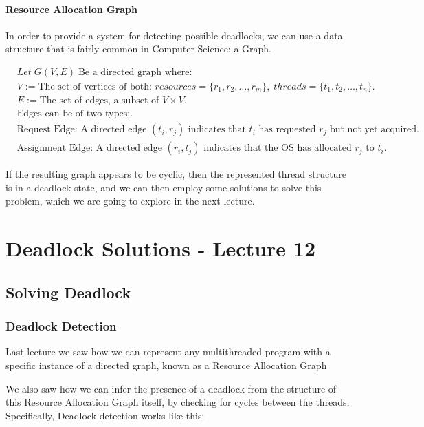 \documentclass[openright, twoside]{report}
\theoremstyle{definition}
\theoremstyle{example}
\newcommand{\sequence}[2]{
		\{ #1_1, #1_2, \dots, #1_#2 \}
}
\begin{document}
			\subsubsection{ Resource Allocation Graph}
			In order to provide a system for detecting possible deadlocks, 
			we can use a data structure that is fairly common in Computer Science: a Graph.

			\begin{align*}
				&Let \; G(V, E) \; \text{Be a directed graph where:}\\
				&V := \text{The set of vertices of both: } resources = \sequence{r}{m}, \; threads = \sequence{t}{n}.\\
				&E := \text{The set of edges, a subset of } V \times V.\\
				&\text{Edges can be of two types:}.\\
				&\text{Request Edge: A directed edge } (t_i, r_j) \text{ indicates that } t_i \text{ has requested } r_j \text{ but not yet acquired}.\\
				&\text{Assignment Edge: A directed edge } (r_i, t_j) \text{ indicates that the OS has allocated } r_j \text{ to } t_i.
			\end{align*}

			If the resulting graph appears to be cyclic, then the represented thread structure is in a deadlock state, and we can then employ some solutions to 
			solve this problem, which we are going to explore in the next lecture.

\chapter{Deadlock Solutions - Lecture 12}
\section{Solving Deadlock}
\subsection{Deadlock Detection}
Last lecture we saw how we can represent any multithreaded program with a 
specific instance of a directed graph, known as a Resource Allocation Graph

We also saw how we can infer the presence of a deadlock from the structure of this 
Resource Allocation Graph itself, by checking for cycles between the threads.\\

Specifically, Deadlock detection works like this:
\end{document}
